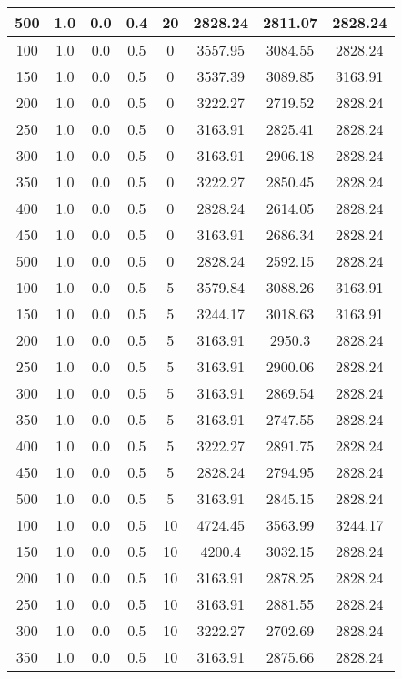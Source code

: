 \documentclass[a4paper, 12pt]{extreport}
\begin{document}
\begin{itemize}
\begin{longtable}{|c|c|c|c|c|c|c|c|}
			500 & 1.0 & 0.0 & 0.4 & 20 & 2828.24 & 2811.07 & 2828.24 \\\hline
			100 & 1.0 & 0.0 & 0.5 & 0 & 3557.95 & 3084.55 & 2828.24 \\\hline
			150 & 1.0 & 0.0 & 0.5 & 0 & 3537.39 & 3089.85 & 3163.91 \\\hline
			200 & 1.0 & 0.0 & 0.5 & 0 & 3222.27 & 2719.52 & 2828.24 \\\hline
			250 & 1.0 & 0.0 & 0.5 & 0 & 3163.91 & 2825.41 & 2828.24 \\\hline
			300 & 1.0 & 0.0 & 0.5 & 0 & 3163.91 & 2906.18 & 2828.24 \\\hline
			350 & 1.0 & 0.0 & 0.5 & 0 & 3222.27 & 2850.45 & 2828.24 \\\hline
			400 & 1.0 & 0.0 & 0.5 & 0 & 2828.24 & 2614.05 & 2828.24 \\\hline
			450 & 1.0 & 0.0 & 0.5 & 0 & 3163.91 & 2686.34 & 2828.24 \\\hline
			500 & 1.0 & 0.0 & 0.5 & 0 & 2828.24 & 2592.15 & 2828.24 \\\hline
			100 & 1.0 & 0.0 & 0.5 & 5 & 3579.84 & 3088.26 & 3163.91 \\\hline
			150 & 1.0 & 0.0 & 0.5 & 5 & 3244.17 & 3018.63 & 3163.91 \\\hline
			200 & 1.0 & 0.0 & 0.5 & 5 & 3163.91 & 2950.3 & 2828.24 \\\hline
			250 & 1.0 & 0.0 & 0.5 & 5 & 3163.91 & 2900.06 & 2828.24 \\\hline
			300 & 1.0 & 0.0 & 0.5 & 5 & 3163.91 & 2869.54 & 2828.24 \\\hline
			350 & 1.0 & 0.0 & 0.5 & 5 & 3163.91 & 2747.55 & 2828.24 \\\hline
			400 & 1.0 & 0.0 & 0.5 & 5 & 3222.27 & 2891.75 & 2828.24 \\\hline
			450 & 1.0 & 0.0 & 0.5 & 5 & 2828.24 & 2794.95 & 2828.24 \\\hline
			500 & 1.0 & 0.0 & 0.5 & 5 & 3163.91 & 2845.15 & 2828.24 \\\hline
			100 & 1.0 & 0.0 & 0.5 & 10 & 4724.45 & 3563.99 & 3244.17 \\\hline
			150 & 1.0 & 0.0 & 0.5 & 10 & 4200.4 & 3032.15 & 2828.24 \\\hline
			200 & 1.0 & 0.0 & 0.5 & 10 & 3163.91 & 2878.25 & 2828.24 \\\hline
			250 & 1.0 & 0.0 & 0.5 & 10 & 3163.91 & 2881.55 & 2828.24 \\\hline
			300 & 1.0 & 0.0 & 0.5 & 10 & 3222.27 & 2702.69 & 2828.24 \\\hline
			350 & 1.0 & 0.0 & 0.5 & 10 & 3163.91 & 2875.66 & 2828.24 \\\hline

\end{longtable}
\end{itemize}
\end{document}
